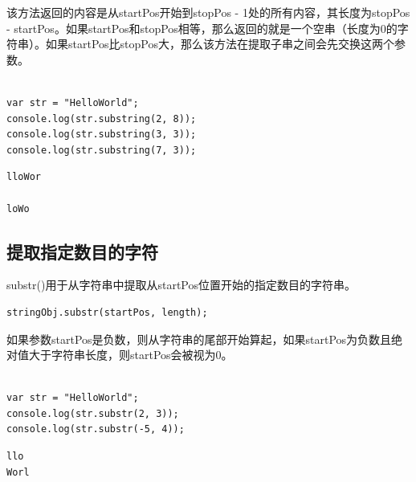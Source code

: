 该方法返回的内容是从startPos开始到stopPos - 1处的所有内容，其长度为stopPos - startPos。如果startPos和stopPos相等，那么返回的就是一个空串（长度为0的字符串）。如果startPos比stopPos大，那么该方法在提取子串之间会先交换这两个参数。\\

\\

\begin{lstlisting}[style=htmlcssjs]
var str = "HelloWorld";
console.log(str.substring(2, 8));
console.log(str.substring(3, 3));
console.log(str.substring(7, 3));
\end{lstlisting}

\begin{tcolorbox}
	\begin{verbatim}
lloWor

loWo
	\end{verbatim}
\end{tcolorbox}

\vspace{0.5cm}

\subsection{提取指定数目的字符}

substr()用于从字符串中提取从startPos位置开始的指定数目的字符串。\\

\begin{lstlisting}[style=htmlcssjs]
stringObj.substr(startPos, length);
\end{lstlisting}

如果参数startPos是负数，则从字符串的尾部开始算起，如果startPos为负数且绝对值大于字符串长度，则startPos会被视为0。\\

\\

\begin{lstlisting}[style=htmlcssjs]
var str = "HelloWorld";
console.log(str.substr(2, 3));
console.log(str.substr(-5, 4));
\end{lstlisting}

\begin{tcolorbox}
	\begin{verbatim}
llo
Worl
	\end{verbatim}
\end{tcolorbox}

\newpage

